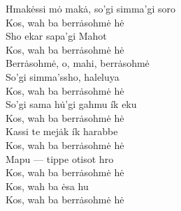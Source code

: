 \documentclass{article}[10pt]
\begin{document}
\noindent
Hmak\.{e}ssi m\.{o} mak\.{a}, so'gi simma'gi soro\\
Kos, wah ba berr\.{a}sohm\.{e} h\.{e}\\
Sho ekar sapa'gi Mahot\\
Kos, wah ba berr\.{a}sohm\.{e} h\.{e}\\
Berr\.{a}sohm\.{e}, o, mahi, berr\.{a}sohm\.{e}\\
So'gi simma'ssho, haleluya\\
Kos, wah ba berr\.{a}sohm\.{e} h\.{e}\\
So'gi sama h\.{u}'gi gahmu \'{i}k eku\\
Kos, wah ba berr\.{a}sohm\.{e} h\.{e}\\
Kassi te mej\.{a}k \'{i}k harabbe\\
Kos, wah ba berr\.{a}sohm\.{e} h\.{e}\\
Mapu --- tippe otisot hro\\
Kos, wah ba berr\.{a}sohm\.{e} h\.{e}\\
Kos, wah ba \.{e}sa hu\\
Kos, wah ba berr\.{a}sohm\.{e} h\.{e}\\
\end{document}
